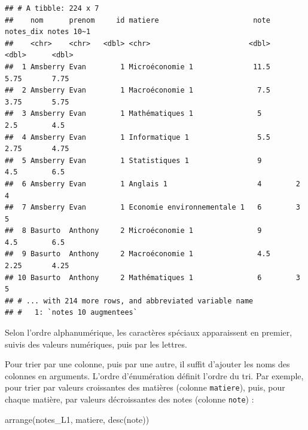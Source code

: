 \documentclass[
  11pt,
]{book}
\newenvironment{Shaded}{\begin{snugshade}}{\end{snugshade}}
\newcommand{\FunctionTok}[1]{\textcolor[rgb]{0.00,0.00,0.00}{#1}}
\newcommand{\NormalTok}[1]{#1}
\numberwithin{equation}{section}
\numberwithin{countremarque}{section}
\newenvironment{notebox}{
  \begin{tcolorbox}[breakable, colback=jaune,coltext=black,
                  colframe=grisfonce]}
 {\end{tcolorbox}}
\begin{document}
\begin{lstlisting}
## # A tibble: 224 x 7
##    nom      prenom     id matiere                      note notes_dix notes 10~1
##    <chr>    <chr>   <dbl> <chr>                       <dbl>     <dbl>      <dbl>
##  1 Amsberry Evan        1 Microéconomie 1              11.5      5.75       7.75
##  2 Amsberry Evan        1 Macroéconomie 1               7.5      3.75       5.75
##  3 Amsberry Evan        1 Mathématiques 1               5        2.5        4.5 
##  4 Amsberry Evan        1 Informatique 1                5.5      2.75       4.75
##  5 Amsberry Evan        1 Statistiques 1                9        4.5        6.5 
##  6 Amsberry Evan        1 Anglais 1                     4        2          4   
##  7 Amsberry Evan        1 Economie environnementale 1   6        3          5   
##  8 Basurto  Anthony     2 Microéconomie 1               9        4.5        6.5 
##  9 Basurto  Anthony     2 Macroéconomie 1               4.5      2.25       4.25
## 10 Basurto  Anthony     2 Mathématiques 1               6        3          5   
## # ... with 214 more rows, and abbreviated variable name
## #   1: `notes 10 augmentees`
\end{lstlisting}

\begin{notebox}
Selon l'ordre alphanumérique, les caractères spéciaux apparaissent en premier, suivis des valeurs numériques, puis par les lettres.

\end{notebox}

Pour trier par une colonne, puis par une autre, il suffit d'ajouter les noms des colonnes en arguments. L'ordre d'énumération définit l'ordre du tri. Par exemple, pour trier par valeurs croissantes des matières (colonne \texttt{matiere}), puis, pour chaque matière, par valeurs décroissantes des notes (colonne \texttt{note}) :

\begin{Shaded}
\begin{Highlighting}[]
\FunctionTok{arrange}\NormalTok{(notes\_L1, matiere, }\FunctionTok{desc}\NormalTok{(note))}
\end{Highlighting}
\end{Shaded}
\end{document}
